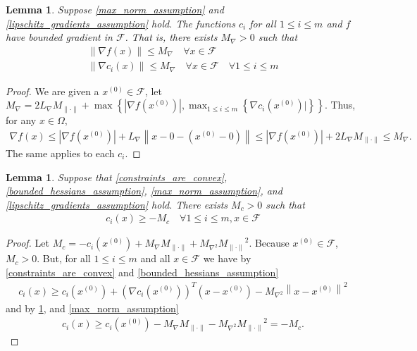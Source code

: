 \documentclass{article}
\newtheorem{lemma}[theorem]{Lemma}
\theoremstyle{case}
\numberwithin{theorem}{subsection}
\newcommand{\feasible}{{\mathcal F}}
\newcommand{\gradf}{\nabla f}
\newcommand{\lipgrad}{{L_{\nabla}}}
\newcommand{\maxgrad}{{M_{\nabla}}}
\newcommand{\maxhessian}{{M_{\nabla^2}}}
\newcommand{\maxnorm}{{M_{\|\cdot\|}}}
\begin{document}
\begin{lemma}
\label{bounded_gradients_lemma}
Suppose \cref{max_norm_assumption} and \cref{lipschitz_gradients_assumption} hold.
The functions $c_i$ for all $ 1 \le i \le m$ and $f$ have bounded gradient in $ \feasible $.
That is, there exists $\maxgrad > 0$ such that
\begin{align}
\|\gradf(x)\| \le \maxgrad \quad  \forall x \in \feasible \\
\|\nabla c_i(x)\| \le \maxgrad \quad  \forall x \in \feasible \quad \forall 1 \le i \le m
\end{align}
\end{lemma}
\begin{proof}
We are given a $x^{(0)} \in \feasible$, let $\maxgrad = 2\lipgrad \maxnorm + \max\left\{|\gradf(x^{(0)})|, \max_{1\le i\le m}\left\{\nabla c_i(x^{(0)})|\right\} \right\}$.
Thus, for any $x \in \Omega$,
\begin{align*}
\gradf(x) \le |\gradf(x^{(0)})| + \lipgrad \left\|x - 0 - (x^{(0)} - 0)\right\| \le |\gradf(x^{(0)})| + 2\lipgrad \maxnorm \le \maxgrad.
\end{align*}
The same applies to each $c_i$.
\end{proof}


\begin{lemma}
\label{maximum_constraint_value_lemma}
Suppose that \cref{constraints_are_convex}, \cref{bounded_hessians_assumption}, \cref{max_norm_assumption}, and \cref{lipschitz_gradients_assumption} hold.
There exists $M_c>0$ such that
\begin{align*}
c_i(x) \ge -M_c \quad \forall 1\le i \le m, x \in \feasible
\end{align*}
\end{lemma}
\begin{proof}
Let $M_c = -c_i(x^{(0)}) + \maxgrad\maxnorm + \maxhessian \maxnorm^2$.
Because $x^{(0)} \in\feasible$, $M_c > 0$.
But, for all $1 \le i \le m$ and all $x \in \feasible$ we have by 
\cref{constraints_are_convex} and \cref{bounded_hessians_assumption}
\begin{align*}
c_i(x) \ge c_i(x^{(0)}) + \left(\nabla c_i(x^{(0)})\right)^T\left(x - x^{(0)}\right) - \maxhessian \left\|x - x^{(0)}\right\|^2
\end{align*}
and by \cref{bounded_gradients_lemma}, and \cref{max_norm_assumption}
\begin{align*}
c_i(x) \ge c_i(x^{(0)}) - \maxgrad\maxnorm - \maxhessian \maxnorm^2 = -M_c.
\end{align*}
\end{proof}
\end{document}
